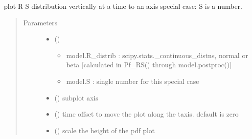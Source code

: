 \documentclass[letterpaper,10pt,english]{sphinxmanual}
\begin{document}
\begin{fulllineitems}
\label{\detokenize{membrane:membrane.RS_plot_special}}
\sphinxAtStartPar
plot R S distribution vertically at a time to an axis special case: S is a number.
\begin{quote}\begin{description}
\item[{Parameters}] \leavevmode\begin{itemize}
\item {} 
\sphinxAtStartPar
{} () \textendash{} \begin{itemize}
\item {} 
\sphinxAtStartPar
model.R\_distrib : scipy.stats.\_continuous\_distns, normal or beta {[}calculated in Pf\_RS() through model.postproc(){]}

\item {} 
\sphinxAtStartPar
model.S : single number for this special case

\end{itemize}


\item {} 
\sphinxAtStartPar
{} () \textendash{} subplot axis

\item {} 
\sphinxAtStartPar
{} (\sphinxstyleliteralemphasis{\sphinxupquote{, }}) \textendash{} time offset to move the plot along the t\sphinxhyphen{}axis. default is zero

\item {} 
\sphinxAtStartPar
{} () \textendash{} scale the height of the pdf plot

\end{itemize}

\end{description}\end{quote}

\end{fulllineitems}
\end{document}
